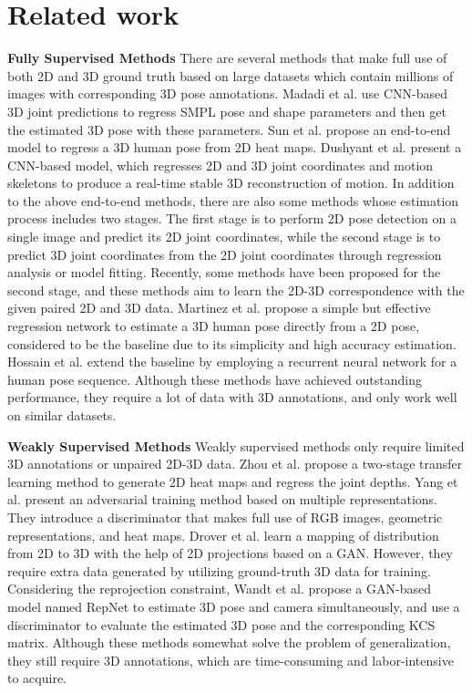 \documentclass[10pt,twocolumn,letterpaper]{article}
\begin{document}
\section{Related work}
\noindent
{\bf Fully Supervised Methods} There are several methods that make full use of both 2D and 3D ground truth based on large datasets which contain millions of images with corresponding 3D pose annotations. Madadi et al.\cite{MADADI2020107472} use CNN-based 3D joint predictions to regress SMPL pose and shape parameters and then get the estimated 3D pose with these parameters. Sun et al.\cite{ferrari_integral_2018} propose an end-to-end model to regress a 3D human pose from 2D heat maps. Dushyant et al.\cite{2017VNect} present a CNN-based model, which regresses 2D and 3D joint coordinates and motion skeletons to produce a real-time stable 3D reconstruction of motion. In addition to the above end-to-end methods, there are also some methods whose estimation process includes two stages. The first stage is to perform 2D pose detection on a single image and predict its 2D joint coordinates\cite{2016Human,2017Realtime,carreira_human_2016,2016Stacked,2016DeepCut,2019Deep,toshev_deeppose_2014}, while the second stage is to predict 3D joint coordinates from the 2D joint coordinates through regression analysis or model fitting\cite{KIM2020107462,2018Unsupervised,2017A,2019RepNet}. Recently, some methods have been proposed for the second stage, and these methods aim to learn the 2D-3D correspondence with the given paired 2D and 3D data. Martinez et al.\cite{2017A} propose a simple but effective regression network to estimate a 3D human pose directly from a 2D pose, considered to be the baseline due to its simplicity and high accuracy estimation. Hossain et al.\cite{2017Exploiting} extend the baseline by employing a recurrent neural network for a human pose sequence. 
Although these methods have achieved outstanding performance, they require a lot of data with 3D annotations, and only work well on similar datasets.

\noindent
{\bf Weakly Supervised Methods} Weakly supervised methods only require limited 3D annotations or unpaired 2D-3D data. Zhou et al.\cite{2017Towards} propose a two-stage transfer learning method to generate 2D heat maps and regress the joint depths. Yang et al.\cite{yang_3d_2018} present an adversarial training method based on multiple representations. They introduce a discriminator that makes full use of RGB images, geometric representations, and heat maps. Drover et al.\cite{2018can} learn a mapping of distribution from 2D to 3D with the help of 2D projections based on a GAN\cite{goodfellow_i_generative_2014}. However, they require extra data generated by utilizing ground-truth 3D data for training. Considering the reprojection constraint, Wandt et al.\cite{2019RepNet} propose a GAN-based model named RepNet to estimate 3D pose and camera simultaneously, and use a discriminator to evaluate the estimated 3D pose and the corresponding KCS matrix. 
Although these methods somewhat solve the problem of generalization, they still require 3D annotations, which are time-consuming and labor-intensive to acquire.
\end{document}
